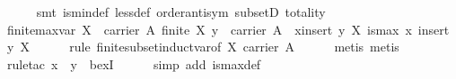 \begin{isabellebody}
%
\isadelimproof
\ \ \ \ %
\endisadelimproof
%
\isatagproof
{}\isamarkupfalse%
\ {}smt\ is{}min{}def\ less{}def\ order{}antisym\ subsetD\ totality{}%
\endisatagproof
{\isafoldproof}%
%
\isadelimproof
\isanewline
%
\endisadelimproof
\isanewline
\ \ \isamarkupfalse%
\ finite{}max{}var{}\ {}{}X\ {}\ carrier\ A{}\ finite\ X{}\ y\ {}\ carrier\ A{}\ {}\ {}{}x{}{}insert\ y\ X{}{}\ is{}max\ x\ {}insert\ y\ X{}{}{}\isanewline
%
\isadelimproof
\ \ \ \ %
\endisadelimproof
%
\isatagproof
{}\isamarkupfalse%
\ {}rule\ finite{}subset{}induct{}var{}of\ X\ {}carrier\ A{}{}{}\isanewline
\ \ \ \ \isamarkupfalse%
\ {}metis{}\ metis{}\isanewline
\ \ \ \ \isamarkupfalse%
\ {}rule{}tac\ x\ {}\ y\ \ bexI{}\isanewline
\ \ \ \ \isamarkupfalse%
\ {}simp\ add{}\ is{}max{}def{}\isanewline

\end{isabellebody}
